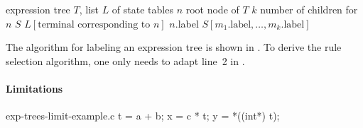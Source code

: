 \begin{algorithm}[t]
               {expression tree $T$, list $L$ of state tables}%
  {%
    $n$ \Assign root node of $T$\;
    $k$ \Assign number of children for $n$\;
    $S$ \Assign $L[\text{terminal corresponding to $n$}]$\;
    $n$.label \Assign $S[m_1.\text{label}, \ldots, m_k.\text{label}]$\;
  }

  \caption[%
            Algorithm for labeling an expression tree for optimal pattern
            selection%
          ]{%
            Labels an expression tree for optimal pattern selection%
          }
\end{algorithm}

The algorithm for labeling an \gls{expression tree} is shown in
.
%
To derive the \gls{rule} selection algorithm, one only needs to adapt line~2 in
.



\paragraph{Limitations}

\begin{filecontents*}{exp-trees-limit-example.c}
t = a + b;
x = c * t;
y = *((int*) t);
\end{filecontents*}

